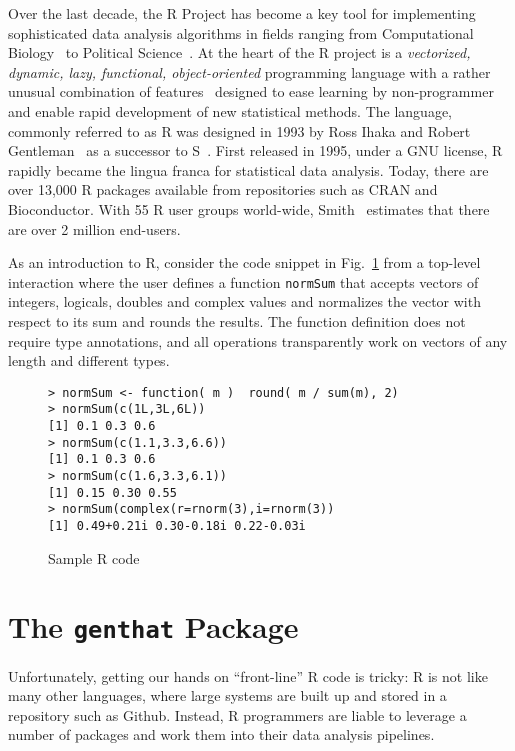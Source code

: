 \documentclass[acmsmall,10pt,review,anonymous]{acmart}\settopmatter{printfolios=true,printccs=false,printacmref=false}
\newcommand{\code}[1]{\lstinline|#1|\xspace}
\begin{document}
Over the last decade, the R Project has become a key tool for implementing
sophisticated data analysis algorithms in fields ranging from Computational
Biology~\cite{R05} to Political Science~\cite{R:Keele:2008}. At the heart of
the R project is a \emph{vectorized, dynamic, lazy, functional,
  object-oriented} programming language with a rather unusual combination of
features~\cite{ecoop12} designed to ease learning by non-programmer and
enable rapid development of new statistical methods.  The language, commonly
referred to as R was designed in 1993 by Ross Ihaka and Robert
Gentleman~\cite{R96} as a successor to S~\cite{S88}.  First released in
1995, under a GNU license, R rapidly became the lingua franca for
statistical data analysis. Today, there are over 13,000 R packages available
from repositories such as CRAN and Bioconductor.  With 55 R user groups
world-wide, Smith~\cite{eco11} estimates that there are over 2 million
end-users.


As an introduction to R, consider the code snippet in Fig.~\ref{sample} from
a top-level interaction where the user defines a function \code{normSum}
that accepts vectors of integers, logicals, doubles and complex values and
normalizes the vector with respect to its sum and rounds the results. The
function definition does not require type annotations, and all operations
transparently work on vectors of any length and different types.

\begin{figure}{\small
\begin{lstlisting}[style=R]
> normSum <- function( m )  round( m / sum(m), 2)
> normSum(c(1L,3L,6L))
[1] 0.1 0.3 0.6
> normSum(c(1.1,3.3,6.6))
[1] 0.1 0.3 0.6
> normSum(c(1.6,3.3,6.1))
[1] 0.15 0.30 0.55
> normSum(complex(r=rnorm(3),i=rnorm(3))
[1] 0.49+0.21i 0.30-0.18i 0.22-0.03i
\end{lstlisting}}
\caption{Sample R code}\label{sample}
\end{figure}




\section{The \texttt{genthat} Package}

Unfortunately, getting our hands on ``front-line'' R code is tricky: R is
not like many other languages, where large systems are built up and stored
in a repository such as Github.  Instead, R programmers are liable to
leverage a number of packages and work them into their data analysis
pipelines.
\end{document}

